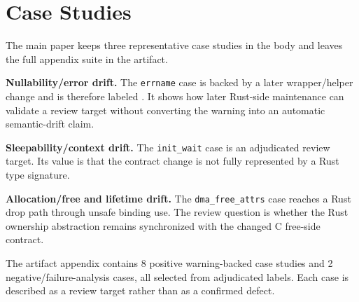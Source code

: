 \section{Case Studies}

The main paper keeps three representative case studies in the body and leaves
the full appendix suite in the artifact.

\textbf{Nullability/error drift.} The \texttt{errname} case is backed by a
later wrapper/helper change and is therefore labeled \truewrapper{}. It shows
how later Rust-side maintenance can validate a review target without converting
the warning into an automatic semantic-drift claim.

\textbf{Sleepability/context drift.} The \texttt{init\_wait} case is an
adjudicated \truesemantic{} review target. Its value is that the contract
change is not fully represented by a Rust type signature.

\textbf{Allocation/free and lifetime drift.} The \texttt{dma\_free\_attrs}
case reaches a Rust drop path through unsafe binding use. The review question is
whether the Rust ownership abstraction remains synchronized with the changed C
free-side contract.

The artifact appendix contains 8 positive warning-backed case studies and 2
negative/failure-analysis cases, all selected from adjudicated labels. Each
case is described as a review target rather than as a confirmed defect.
